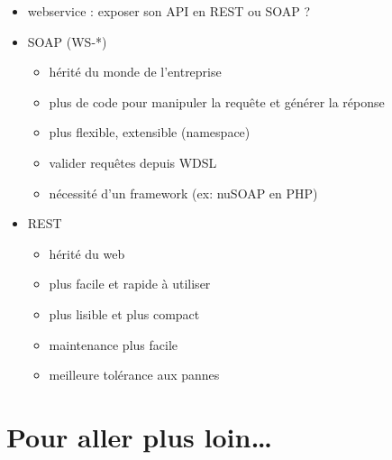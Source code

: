 \begin{itemize}
\tightlist
\item
  webservice : exposer son API en REST ou SOAP ?
\item
  SOAP (WS-*)

  \begin{itemize}
  \tightlist
  \item
    hérité du monde de l'entreprise
  \item
    plus de code pour manipuler la requête et générer la réponse
  \item
    plus flexible, extensible (namespace)
  \item
    valider requêtes depuis WDSL
  \item
    nécessité d'un framework (ex: nuSOAP en PHP)
  \end{itemize}
\item
  REST

  \begin{itemize}
  \tightlist
  \item
    hérité du web
  \item
    plus facile et rapide à utiliser
  \item
    plus lisible et plus compact
  \item
    maintenance plus facile
  \item
    meilleure tolérance aux pannes
  \end{itemize}
\end{itemize}

\hypertarget{pour-aller-plus-loin}{%
\section{Pour aller plus loin\ldots{}}\label{pour-aller-plus-loin}}

